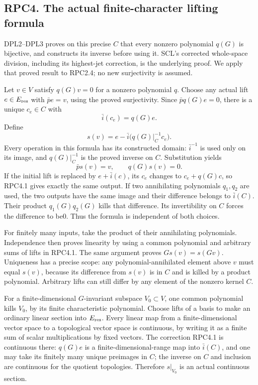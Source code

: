 \subsection{RPC4. The actual finite-character lifting
formula}\label{rpc4.-the-actual-finite-character-lifting-formula}

DPL2--DPL3 proves on this precise \(C\) that every nonzero polynomial
\(q(G)\) is bijective, and constructs its inverse before using it. SCL's
corrected whole-space division, including its highest-jet correction, is
the underlying proof. We apply that proved result to RPC2.4; no new
surjectivity is assumed.

Let \(v\in V\) satisfy \(q(G)v=0\) for a nonzero polynomial \(q\).
Choose any actual lift \(e\in E_{\rm res}\) with \(\bar p e=v\), using
the proved surjectivity. Since \(\bar p q(G)e=0\), there is a unique
\(c_e\in C\) with \[
\bar i(c_e)=q(G)e.
\] Define \[
\boxed{s(v)=e-\bar i\bigl(q(G)|_C^{-1}c_e\bigr).}
\tag{RPC4.1}
\] Every operation in this formula has its constructed domain:
\(\bar i^{-1}\) is used only on its image, and \(q(G)|_C^{-1}\) is the
proved inverse on \(C\). Substitution yields \[
\bar p s(v)=v,\qquad q(G)s(v)=0.
\tag{RPC4.2}
\] If the initial lift is replaced by \(e+\bar i(c)\), its \(c_e\)
changes to \(c_e+q(G)c\), so RPC4.1 gives exactly the same output. If
two annihilating polynomials \(q_1,q_2\) are used, the two outputs have
the same image and their difference belongs to \(\bar i(C)\). Their
product \(q_1(G)q_2(G)\) kills that difference. Its invertibility on
\(C\) forces the difference to be0. Thus the formula is independent of
both choices.

For finitely many inputs, take the product of their annihilating
polynomials. Independence then proves linearity by using a common
polynomial and arbitrary sums of lifts in RPC4.1. The same argument
proves \(Gs(v)=s(Gv)\). Uniqueness has a precise scope: any
polynomial-annihilated element above \(v\) must equal \(s(v)\), because
its difference from \(s(v)\) is in \(C\) and is killed by a product
polynomial. Arbitrary lifts can still differ by any element of the
nonzero kernel \(C\).

For a finite-dimensional \(G\)-invariant subspace \(V_0\subset V\), one
common polynomial kills \(V_0\), by its finite characteristic
polynomial. Choose lifts of a basis to make an ordinary linear section
into \(E_{\rm res}\). Every linear map from a finite-dimensional vector
space to a topological vector space is continuous, by writing it as a
finite sum of scalar multiplications by fixed vectors. The correction
RPC4.1 is continuous there: \(q(G)e\) is a finite-dimensional-range map
into \(\bar i(C)\), and one may take its finitely many unique preimages
in \(C\); the inverse on \(C\) and inclusion are continuous for the
quotient topologies. Therefore \(s|_{V_0}\) is an actual continuous
section.

